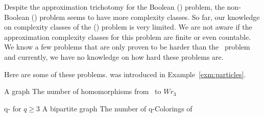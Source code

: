 Despite the approximation trichotomy for the Boolean \ccsp(\mrelset) problem,
the non-Boolean \ccsp(\mrelset) problem seems to have more complexity classes.
So far, our knowledge on complexity classes of the \ccsp(\mrelset) problem 
is very limited. We are not aware if the approximation
complexity classes for this problem are finite or even countable.
We know a few problems that are only proven to be harder than
the \cbis\ problem \cite{Leslie03} and currently, 
we have no knowledge on how hard these problems are.

Here are some of these problems.  was introduced in
Example~\ref{exm:particles}.

{A graph \mG}
{The number of homomorphisms from \mG\ to \(Wr_3\)}

\pdef
{ q- for \(q\ge 3\)}
{A bipartite graph \mG}
{The number of q-Colorings of \mG}
